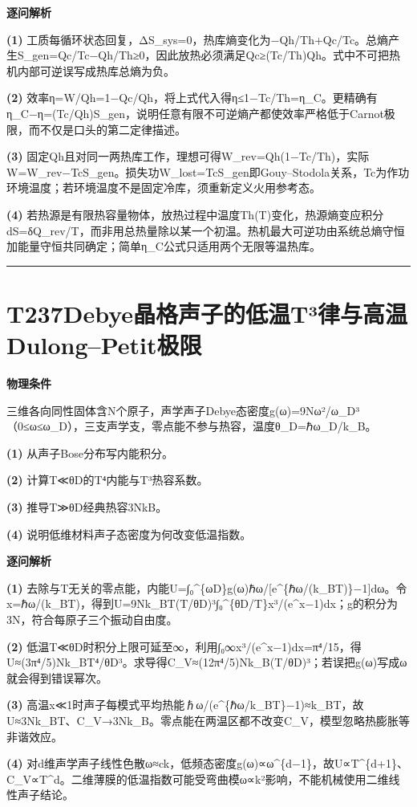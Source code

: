 \documentclass[UTF8,a4paper,11pt,oneside,openany]{ctexbook}
\begin{document}
\par\medskip\noindent\textbf{逐问解析}
\par\noindent\textbf{(1)} 工质每循环状态回复，ΔS\_sys=0，热库熵变化为−Qh/Th+Qc/Tc。总熵产生S\_gen=Qc/Tc−Qh/Th≥0，因此放热必须满足Qc≥(Tc/Th)Qh。式中不可把热机内部可逆误写成热库总熵为负。
\par\noindent\textbf{(2)} 效率η=W/Qh=1−Qc/Qh，将上式代入得η≤1−Tc/Th=η\_C。更精确有η\_C−η=(Tc/Qh)S\_gen，说明任意有限不可逆熵产都使效率严格低于Carnot极限，而不仅是口头的第二定律描述。
\par\noindent\textbf{(3)} 固定Qh且对同一两热库工作，理想可得W\_rev=Qh(1−Tc/Th)，实际W=W\_rev−TcS\_gen。损失功W\_lost=TcS\_gen即Gouy–Stodola关系，Tc为作功环境温度；若环境温度不是固定冷库，须重新定义火用参考态。
\par\noindent\textbf{(4)} 若热源是有限热容量物体，放热过程中温度Th(T)变化，热源熵变应积分dS=δQ\_rev/T，而非用总热量除以某一个初温。热机最大可逆功由系统总熵守恒加能量守恒共同确定；简单η\_C公式只适用两个无限等温热库。

\par\bigskip\hrule\bigskip
\section*{T237\quad Debye晶格声子的低温T³律与高温Dulong–Petit极限}
\textbf{物理条件}\par 三维各向同性固体含N个原子，声学声子Debye态密度g(ω)=9Nω²/ω\_D³（0≤ω≤ω\_D），三支声学支，零点能不参与热容，温度θ\_D=ℏω\_D/k\_B。
\par\noindent\textbf{(1)} 从声子Bose分布写内能积分。
\par\noindent\textbf{(2)} 计算T≪θD的T⁴内能与T³热容系数。
\par\noindent\textbf{(3)} 推导T≫θD经典热容3NkB。
\par\noindent\textbf{(4)} 说明低维材料声子态密度为何改变低温指数。

\par\medskip\noindent\textbf{逐问解析}
\par\noindent\textbf{(1)} 去除与T无关的零点能，内能U=∫₀\textasciicircum{}\{ωD\}g(ω)ℏω/[e\textasciicircum{}\{ℏω/(k\_BT)\}−1]dω。令x=ℏω/(k\_BT)，得到U=9Nk\_BT(T/θD)³∫₀\textasciicircum{}\{θD/T\}x³/(e\textasciicircum{}x−1)dx；g的积分为3N，符合每原子三个振动自由度。
\par\noindent\textbf{(2)} 低温T≪θD时积分上限可延至∞，利用∫₀∞x³/(e\textasciicircum{}x−1)dx=π⁴/15，得U≈(3π⁴/5)Nk\_BT⁴/θD³。求导得C\_V≈(12π⁴/5)Nk\_B(T/θD)³；若误把g(ω)写成ω就会得到错误幂次。
\par\noindent\textbf{(3)} 高温x≪1时声子每模式平均热能ℏω/(e\textasciicircum{}\{ℏω/k\_BT\}−1)≈k\_BT，故U≈3Nk\_BT、C\_V→3Nk\_B。零点能在两温区都不改变C\_V，模型忽略热膨胀等非谐效应。
\par\noindent\textbf{(4)} 对d维声学声子线性色散ω≈ck，低频态密度g(ω)∝ω\textasciicircum{}\{d−1\}，故U∝T\textasciicircum{}\{d+1\}、C\_V∝T\textasciicircum{}d。二维薄膜的低温指数可能受弯曲模ω∝k²影响，不能机械使用二维线性声子结论。
\end{document}
